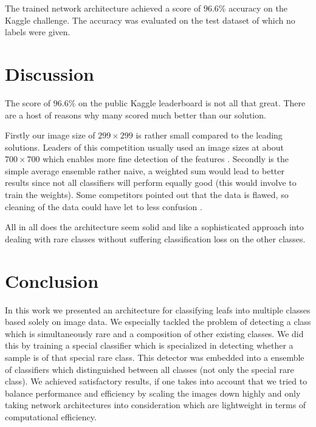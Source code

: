 \documentclass[10pt,twocolumn,letterpaper]{article}
\begin{document}
The trained network architecture achieved a score of $96.6\%$ accuracy on the Kaggle challenge. The accuracy was evaluated on the test dataset of which no labels were given.
\section{Discussion}
The score of $96.6\%$ on the public Kaggle leaderboard is not all that great. There are a host of reasons why many scored much better than our solution.

Firstly our image size of $299 \times 299$ is rather small compared to the leading solutions. Leaders of this competition usually used an image sizes at about $700 \times 700$ which enables more fine detection of the features \cite{kaggelLeader1, kaggelLeader2, kaggelLeader3}. Secondly is the simple average ensemble rather naive, a weighted sum would lead to better results since not all classifiers will perform equally good (this would involve to train the weights).   Some competitors pointed out that the data is flawed, so cleaning of the data could have let to less confusion \cite{kaggleData}.

All in all does the architecture seem solid and like a sophisticated approach into dealing with rare classes without suffering classification loss on the other classes.
\section{Conclusion}
In this work we presented an architecture for classifying leafs into multiple classes based solely on image data. We especially tackled the problem of detecting a class which is simultaneously rare and a composition of other existing classes. We did this by training a special classifier which is specialized in detecting whether a sample is of that special rare class. This detector was embedded into a ensemble of classifiers which distinguished between all classes (not only the special rare class). We achieved satisfactory results, if one takes into account that we tried to balance performance and efficiency by scaling the images down highly and only taking network architectures into consideration which are lightweight in terms of computational efficiency.
{\small


}
\end{document}
